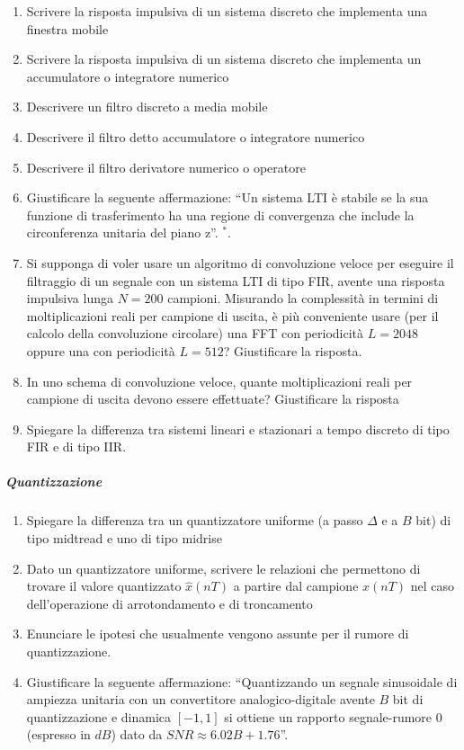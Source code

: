 \documentclass[
]{article}
\providecommand{\tightlist}{%
  \setlength{\itemsep}{0pt}\setlength{\parskip}{0pt}}
\begin{document}
\begin{enumerate}
\def\labelenumi{\arabic{enumi}.}
\setcounter{enumi}{29}
\tightlist
\item
  Scrivere la risposta impulsiva di un sistema discreto che implementa
  una finestra mobile
\item
  Scrivere la risposta impulsiva di un sistema discreto che implementa
  un accumulatore o integratore numerico
\item
  Descrivere un filtro discreto a media mobile
\item
  Descrivere il filtro detto accumulatore o integratore numerico
\item
  Descrivere il filtro derivatore numerico o operatore
\item
  Giustificare la seguente affermazione: ``Un sistema LTI è stabile se
  la sua funzione di trasferimento ha una regione di convergenza che
  include la circonferenza unitaria del piano z''. \(^*\).
\item
  Si supponga di voler usare un algoritmo di convoluzione veloce per
  eseguire il filtraggio di un segnale con un sistema LTI di tipo FIR,
  avente una risposta impulsiva lunga \(N = 200\) campioni. Misurando la
  complessità in termini di moltiplicazioni reali per campione di
  uscita, è più conveniente usare (per il calcolo della convoluzione
  circolare) una FFT con periodicità \(L = 2048\) oppure una con
  periodicità \(L = 512\)? Giustificare la risposta.
\item
  In uno schema di convoluzione veloce, quante moltiplicazioni reali per
  campione di uscita devono essere effettuate? Giustificare la risposta
\item
  Spiegare la differenza tra sistemi lineari e stazionari a tempo
  discreto di tipo FIR e di tipo IIR.
\end{enumerate}

\subparagraph{Quantizzazione}\label{quantizzazione}

\begin{enumerate}
\def\labelenumi{\arabic{enumi}.}
\setcounter{enumi}{38}
\tightlist
\item
  Spiegare la differenza tra un quantizzatore uniforme (a passo
  \(\Delta\) e a \(B\) bit) di tipo midtread e uno di tipo midrise
\item
  Dato un quantizzatore uniforme, scrivere le relazioni che permettono
  di trovare il valore quantizzato \(\hat{x}(nT)\) a partire dal
  campione \(x(nT)\) nel caso dell'operazione di arrotondamento e di
  troncamento
\item
  Enunciare le ipotesi che usualmente vengono assunte per il rumore di
  quantizzazione.
\item
  Giustificare la seguente affermazione: ``Quantizzando un segnale
  sinusoidale di ampiezza unitaria con un convertitore
  analogico-digitale avente \(B\) bit di quantizzazione e dinamica
  \([-1, 1]\) si ottiene un rapporto segnale-rumore 0 (espresso in
  \(dB\)) dato da \(SNR \approx 6.02B + 1.76\)''.
\end{enumerate}
\end{document}
